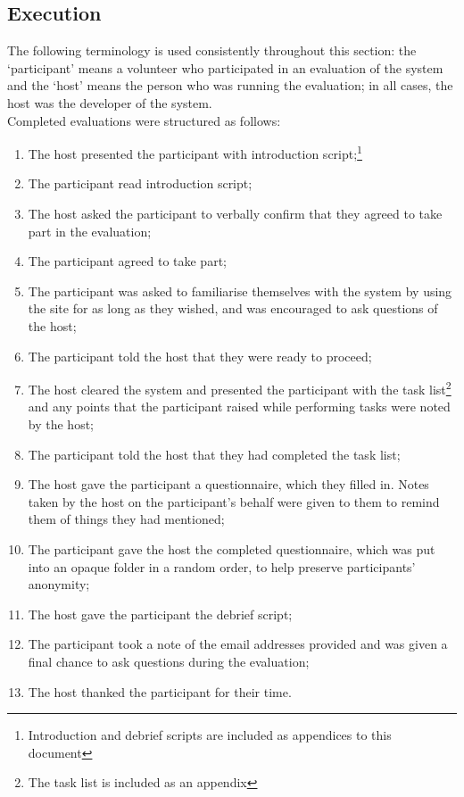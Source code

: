 \documentclass{l4proj}
\begin{document}
\subsection{Execution}
The following terminology is used consistently throughout this section: the `participant' means a volunteer who participated in an evaluation of the system and the `host' means the person who was running the evaluation; in all cases, the host was the developer of the system.\\
Completed evaluations were structured as follows:
\begin{enumerate}
	\item The host presented the participant with introduction script;\footnote{Introduction and debrief scripts are included as appendices to this document}
	\item The participant read introduction script;
	\item The host asked the participant to verbally confirm that they agreed to take part in the evaluation;
	\item The participant agreed to take part;
	\item The participant was asked to familiarise themselves with the system by using the site for as long as they wished, and was encouraged to ask questions of the host;
	\item The participant told the host that they were ready to proceed;
	\item The host cleared the system and presented the participant with the task list\footnote{The task list is included as an appendix} and any points that the participant raised while performing tasks were noted by the host; %
	\item The participant told the host that they had completed the task list;
	\item The host gave the participant a questionnaire, which they filled in. Notes taken by the host on the participant's behalf were given to them to remind them of things they had mentioned;
	\item The participant gave the host the completed questionnaire, which was put into an opaque folder in a random order, to help preserve participants' anonymity;
	\item The host gave the participant the debrief script;
	\item The participant took a note of the email addresses provided and was given a final chance to ask questions during the evaluation;
	\item The host thanked the participant for their time.
\end{enumerate}
\end{document}
